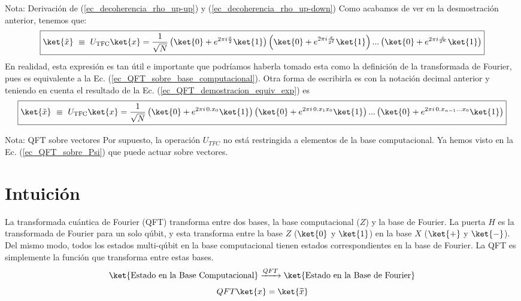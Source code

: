 \documentclass[a4paper,11pt]{book} %
\numberwithin{equation}{chapter}
\begin{document}
\begin{mybox_blue}{Nota: Derivación de (\ref{ec_decoherencia_rho_up-up}) y  (\ref{ec_decoherencia_rho_up-down})}
Como acabamos de ver en la desmostración anterior, tenemos que:
	\begin{equation} \label{ec_QFT_ecuacion_desarrollada}
\boxed{\ket{\tilde x}  ~\equiv ~  U_{\rm TFC}\ket{x} = \frac{1}{\sqrt{N}} \left( \ket{0} + e^{2\pi i \frac{x}{2}}\ket{1}\right)\left( \ket{0} + e^{2\pi i \frac{x}{2^2}}\ket{1}\right)...\left( \ket{0} + e^{2\pi i \frac{x}{2^n}}\ket{1}\right)}
	\end{equation}
En realidad, esta expresión es tan útil e importante que podríamos haberla tomado esta como la definición de la transformada de Fourier, pues es equivalente a la Ec. (\ref{ec_QFT_sobre_base_computacional}). Otra forma de escribirla es con la notación decimal anterior y teniendo en cuenta el resultado de la Ec. (\ref{ec_QFT_demostracion_equiv_exp}) es 
	\begin{equation}
	\boxed{\ket{\tilde x}  ~\equiv ~  U_{\rm TFC}\ket{x} = \frac{1}{\sqrt{N}} \left( \ket{0} + e^{2\pi i \, 0.x_0}\ket{1}\right)\left( \ket{0} + e^{2\pi i \, 0.x_1x_0}\ket{1}\right)...\left( \ket{0} + e^{2\pi i \, 0.x_{n-1}...x_0}\ket{1}\right) }
	\end{equation}



	

	\begin{mybox_blue}{Nota: QFT sobre vectores}
	Por supuesto, la operación $U_{TFC}$ no está restringida a elementos de la base computacional. Ya hemos visto en la Ec. (\ref{ec_QFT_sobre_Psi}) que puede actuar sobre vectores.
	\end{mybox_blue}



	\section{Intuición}


La transformada cuántica de Fourier (QFT) transforma entre dos bases, la base computacional ($Z$) y la base de Fourier. La puerta $H$ es la transformada de Fourier para un solo qúbit, y esta transforma entre la base $Z$ ($\ket{0}$ y $\ket{1}$) en la base $X$ ($\ket{+}$ y $\ket{-}$). Del mismo modo, todos los estados multi-qúbit en la base computacional tienen estados correspondientes en la base de Fourier. La QFT es simplemente la función que transforma entre estas bases.
	\begin{equation*}
	\ket{\text{Estado en la Base Computacional}} \xrightarrow{QFT} \ket{\text{Estado en la Base de Fourier}}
 	\end{equation*}
	\begin{equation*}
	QFT \ket{x} = \ket{\widetilde{x}}
	\end{equation*}


\end{mybox_blue}
\end{document}

